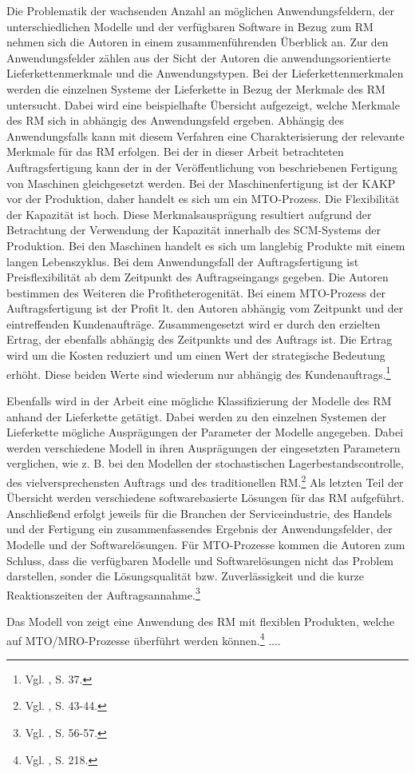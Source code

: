 Die Problematik der wachsenden Anzahl an möglichen Anwendungsfeldern, der unterschiedlichen Modelle und der verfügbaren Software in Bezug zum RM nehmen sich die Autoren \cite{quante2009revenue} in einem zusammenführenden Überblick an. Zur den Anwendungsfelder zählen aus der Sicht der Autoren die anwendungsorientierte Lieferkettenmerkmale und die Anwendungstypen. Bei der Lieferkettenmerkmalen werden die einzelnen Systeme der Lieferkette in Bezug der Merkmale des RM untersucht. Dabei wird eine beispielhafte Übersicht aufgezeigt, welche Merkmale des RM sich in abhängig des Anwendungsfeld ergeben. Abhängig des Anwendungsfalls kann mit diesem Verfahren eine Charakterisierung der relevante Merkmale für das RM erfolgen. Bei der in dieser Arbeit betrachteten Auftragsfertigung kann der in der Veröffentlichung von \cite{quante2009revenue} beschriebenen Fertigung von Maschinen gleichgesetzt werden. Bei der Maschinenfertigung ist der KAKP vor der Produktion, daher handelt es sich um ein MTO-Prozess. Die Flexibilität der Kapazität ist hoch. Diese Merkmalsausprägung resultiert aufgrund der Betrachtung der Verwendung der Kapazität innerhalb des SCM-Systems der Produktion. Bei den Maschinen handelt es sich um langlebig Produkte mit einem langen Lebenszyklus. Bei dem Anwendungsfall der Auftragsfertigung ist Preisflexibilität ab dem Zeitpunkt des Auftragseingangs gegeben. Die Autoren bestimmen des Weiteren die Profitheterogenität. Bei einem MTO-Prozess der Auftragsfertigung ist der Profit lt. den Autoren abhängig vom Zeitpunkt und der eintreffenden Kundenaufträge. Zusammengesetzt wird er durch den erzielten Ertrag, der ebenfalls abhängig des Zeitpunkts und des Auftrags ist. Die Ertrag wird um die Kosten reduziert und um einen Wert der strategische Bedeutung erhöht. Diese beiden Werte sind wiederum nur abhängig des Kundenauftrags.\footnote{Vgl. \cite{quante2009revenue}, S. 37.}

Ebenfalls wird in der Arbeit eine mögliche Klassifizierung der Modelle des RM anhand der Lieferkette getätigt. Dabei werden zu den einzelnen Systemen der Lieferkette mögliche Ausprägungen der Parameter der Modelle angegeben. Dabei werden verschiedene Modell in ihren Ausprägungen der eingesetzten Parametern verglichen, wie z. B. bei den Modellen der stochastischen Lagerbestandscontrolle, des \glqq vielversprechensten Auftrags{\grqq} und des traditionellen RM.\footnote{Vgl. \cite{quante2009revenue}, S. 43-44.} Als letzten Teil der Übersicht werden verschiedene softwarebasierte Lösungen für das RM aufgeführt. Anschließend erfolgt jeweils für die Branchen der Serviceindustrie, des Handels und der Fertigung ein zusammenfassendes Ergebnis der Anwendungsfelder, der Modelle und der Softwarelösungen. Für MTO-Prozesse kommen die Autoren zum Schluss, dass die verfügbaren Modelle und Softwarelösungen nicht das Problem darstellen, sonder die Lösungsqualität bzw. Zuverlässigkeit und die kurze Reaktionszeiten der Auftragsannahme.\footnote{Vgl. \cite{quante2009revenue}, S. 56-57.}

Das Modell von \cite{petrick2012using} zeigt eine Anwendung des RM mit flexiblen Produkten, welche auf MTO/MRO-Prozesse überführt werden können.\footnote{Vgl. \cite{petrick2012using}, S. 218.} ....

